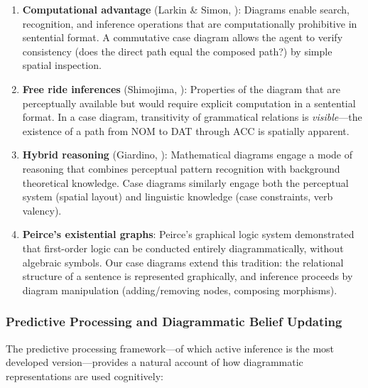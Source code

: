 \documentclass[
]{article}
\numberwithin{equation}{section}
\begin{document}
\begin{enumerate}
\def\labelenumi{\arabic{enumi}.}
\item
  \textbf{Computational advantage} (Larkin \& Simon,
  \citeyearpar{larkin1987diagram}): Diagrams enable search, recognition,
  and inference operations that are computationally prohibitive in
  sentential format. A commutative case diagram allows the agent to
  verify consistency (does the direct path equal the composed path?) by
  simple spatial inspection.
\item
  \textbf{Free ride inferences} (Shimojima,
  \citeyearpar{shimojima1996reasoning}): Properties of the diagram that
  are perceptually available but would require explicit computation in a
  sentential format. In a case diagram, transitivity of grammatical
  relations is \emph{visible}---the existence of a path from NOM to DAT
  through ACC is spatially apparent.
\item
  \textbf{Hybrid reasoning} (Giardino,
  \citeyearpar{giardino2017diagrammatic}): Mathematical diagrams engage
  a mode of reasoning that combines perceptual pattern recognition with
  background theoretical knowledge. Case diagrams similarly engage both
  the perceptual system (spatial layout) and linguistic knowledge (case
  constraints, verb valency).
\item
  \textbf{Peirce's existential graphs}: Peirce's graphical logic system
  demonstrated that first-order logic can be conducted entirely
  diagrammatically, without algebraic symbols. Our case diagrams extend
  this tradition: the relational structure of a sentence is represented
  graphically, and inference proceeds by diagram manipulation
  (adding/removing nodes, composing morphisms).
\end{enumerate}

\subsubsection{Predictive Processing and Diagrammatic Belief
Updating}\label{predictive-processing-and-diagrammatic-belief-updating}

The predictive processing framework---of which active inference is the
most developed version---provides a natural account of how diagrammatic
representations are used cognitively:
\end{document}
